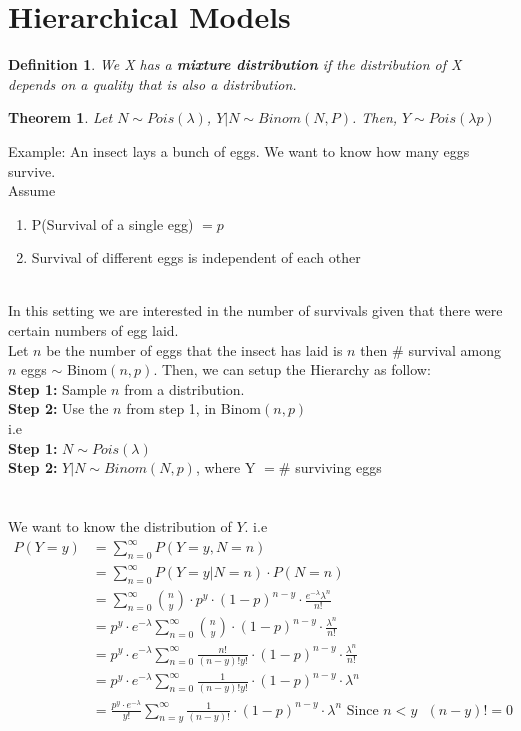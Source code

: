 \documentclass[11pt,oneside]{book}
\theoremstyle{break}
\theoremstyle{break}
\newtheorem{thm}{Theorem}[section]
\newtheorem{defn}{Definition}[corL]
\newcommand{\example}{\color{WildStrawberry}Example: \color{black}}
\begin{document}
\section[Hierarchical Models]{\color{DarkOrchid}Hierarchical Models}
\begin{defn}
We X has a \textbf{mixture distribution} if the distribution of X depends on a quality that is also a distribution.
\end{defn}
\begin{thm}
Let $N\sim Pois(\lambda)$, $Y|N\sim Binom(N,P)$. Then, $Y\sim Pois(\lambda p)$
\end{thm}
\example An insect lays a bunch of eggs. We want to know how many eggs survive.\\ 
Assume \begin{enumerate}[topsep=0pt,itemsep=-1ex,partopsep=1ex,parsep=1ex]
\item P(Survival of a single egg) $=p$
\item Survival of different eggs is independent of each other
\end{enumerate}
\hfill\\
In this setting we are interested in the number of survivals given that there were certain numbers of egg laid.\\
Let $n$ be the number of eggs that the insect has laid is $n$ then $\#$ survival among $n$ eggs $\sim$ Binom$(n,p)$. Then, we can setup the Hierarchy as follow: \\
\text{\qquad} \textbf{Step 1:} Sample $n$ from a distribution.\\
\text{\qquad} \textbf{Step 2:} Use the $n$ from step 1, in Binom$(n,p)$\\
i.e\\
\text{\qquad} \textbf{Step 1:} $N\sim Pois(\lambda)$\\
\text{\qquad} \textbf{Step 2:} $Y|N\sim Binom(N,p)$, where Y $=\#$ surviving eggs\\
\hfill\\
\hfill\\
We want to know the distribution of $Y$. i.e\\\begin{align*}
P(Y=y)&=\sum_{n=0}^{\infty}P(Y=y,N=n)\\
&=\sum_{n=0}^{\infty}P(Y=y|N=n)\cdot P(N=n)\\
&=\sum_{n=0}^{\infty}\binom{n}{y}\cdot p^y \cdot (1-p)^{n-y}\cdot \frac{e^{-\lambda}\lambda^n}{n!}\\
&=p^y \cdot e^{-\lambda}\sum_{n=0}^{\infty}\binom{n}{y}\cdot (1-p)^{n-y}\cdot \frac{\lambda^n}{n!}\\
&=p^y \cdot e^{-\lambda}\sum_{n=0}^{\infty}\frac{n!}{(n-y)!y!}\cdot (1-p)^{n-y}\cdot \frac{\lambda^n}{n!}\\
&=p^y \cdot e^{-\lambda}\sum_{n=0}^{\infty}\frac{1}{(n-y)!y!}\cdot (1-p)^{n-y}\cdot \lambda^n\\
&=\frac{p^y \cdot e^{-\lambda}}{y!}\sum_{n=y}^{\infty}\frac{1}{(n-y)!}\cdot (1-p)^{n-y}\cdot \lambda^n\text{ Since }n<y \text{ }(n-y)!=0
\end{align*}
\end{document}
